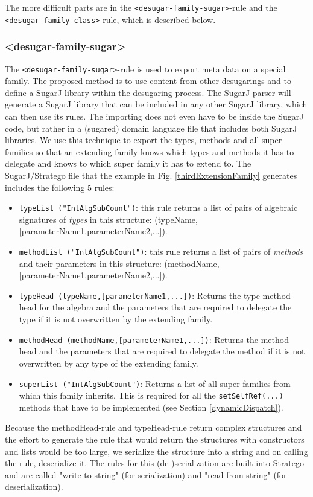 \documentclass{report}
\begin{document}
The more difficult parts are in the \lstinline{<desugar-family-sugar>}-rule and the \lstinline{<desugar-family-class>}-rule, which is described below.

\subsubsection{\textless{}desugar-family-sugar\textgreater}
The \lstinline{<desugar-family-sugar>}-rule is used to export meta data on a special family. The proposed method is to use content from other desugarings and to define a SugarJ library within the desugaring process. The SugarJ parser will generate a SugarJ library that can be included in any other SugarJ library, which can then use its rules. The importing does not even have to be inside the SugarJ code, but rather in a (sugared) domain language file that includes both SugarJ libraries. We use this technique to export the types, methods and all super families so that an extending family knows which types and methods it has to delegate and knows to which super family it has to extend to. The SugarJ/Stratego file that the example in Fig. \ref{thirdExtensionFamily} generates includes the following 5 rules:
\begin{itemize}
    \item \lstinline{typeList ("IntAlgSubCount")}: this rule returns a list of pairs of algebraic signatures of \emph{types} in this structure: (typeName,[parameterName1,parameterName2,...]).
    \item \lstinline{methodList ("IntAlgSubCount")}: this rule returns a list of pairs of \emph{methods} and their parameters in this structure: (methodName,[parameterName1,parameterName2,...]).
    \item \lstinline{typeHead (typeName,[parameterName1,...])}: Returns the type method head for the algebra and the parameters that are required to delegate the type if it is not overwritten by the extending family.
    \item \lstinline{methodHead (methodName,[parameterName1,...])}: Returns the method head and the parameters that are required to delegate the method if it is not overwritten by any type of the extending family.
    \item \lstinline{superList ("IntAlgSubCount")}: Returns a list of all super families from which this family inherits. This is required for all the \lstinline{setSelfRef(...)} methods that have to be implemented (see Section \ref{dynamicDispatch}).
\end{itemize}
Because the methodHead-rule and typeHead-rule return complex structures and the effort to generate the rule that would return the structures with constructors and lists would be too large, we serialize the structure into a string and on calling the rule, deserialize it. The rules for this (de-)serialization are built into Stratego and are called "write-to-string" (for serialization) and "read-from-string" (for deserialization).
\end{document}
